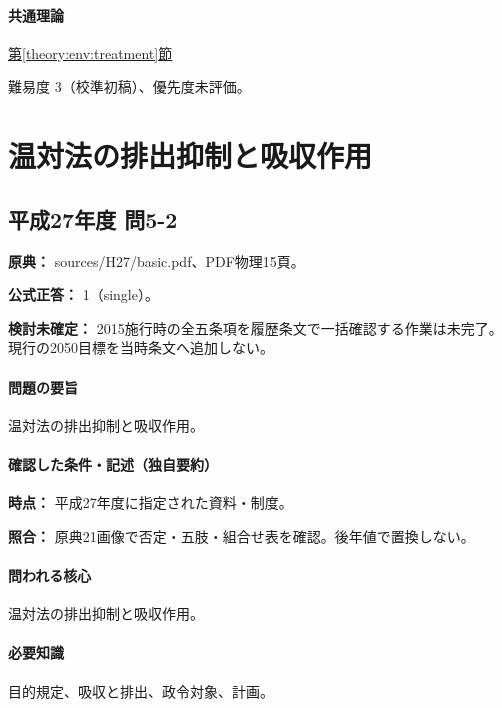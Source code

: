 \paragraph{共通理論} \hyperref[theory:env:treatment]{第\ref*{theory:env:treatment}節}

\par 難易度 3（校準初稿）、優先度未評価。

\section{温対法の排出抑制と吸収作用}

\subsection{平成27年度 問5-2}
\label{q:h27-reg-basic-5-2}

\noindent\textbf{原典：} sources/H27/basic.pdf、PDF物理15頁。

\textbf{公式正答：} 1（single）。

\par\textbf{検討未確定：} 2015施行時の全五条項を履歴条文で一括確認する作業は未完了。現行の2050目標を当時条文へ追加しない。

\paragraph{問題の要旨} 温対法の排出抑制と吸収作用。

\paragraph{確認した条件・記述（独自要約）}\mbox{}\par

\noindent\textbf{時点：} 平成27年度に指定された資料・制度。\par

\noindent\textbf{照合：} 原典21画像で否定・五肢・組合せ表を確認。後年値で置換しない。\par

\paragraph{問われる核心} 温対法の排出抑制と吸収作用。

\paragraph{必要知識} 目的規定、吸収と排出、政令対象、計画。

